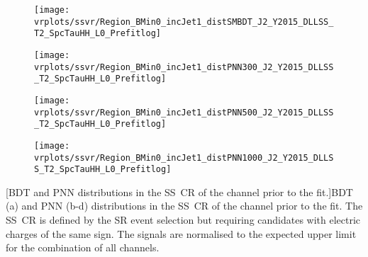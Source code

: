 {
  \centering

  \null\vfill

  \vspace*{1em}


  \begin{subfigure}{0.495\textwidth}
    \centering

    \texttt{[image: vrplots/ssvr/Region\_BMin0\_incJet1\_distSMBDT\_J2\_Y2015\_DLLSS\_T2\_SpcTauHH\_L0\_Prefitlog]}
    \subcaption{}
  \end{subfigure}\hfill%
  \begin{subfigure}{0.495\textwidth}
    \centering

    \texttt{[image: vrplots/ssvr/Region\_BMin0\_incJet1\_distPNN300\_J2\_Y2015\_DLLSS\_T2\_SpcTauHH\_L0\_Prefitlog]}
    \subcaption{}
  \end{subfigure}

  \begin{subfigure}{0.495\textwidth}
    \centering

    \texttt{[image: vrplots/ssvr/Region\_BMin0\_incJet1\_distPNN500\_J2\_Y2015\_DLLSS\_T2\_SpcTauHH\_L0\_Prefitlog]}
    \subcaption{}
  \end{subfigure}\hfill%
  \begin{subfigure}{0.495\textwidth}
    \centering

    \texttt{[image: vrplots/ssvr/Region\_BMin0\_incJet1\_distPNN1000\_J2\_Y2015\_DLLSS\_T2\_SpcTauHH\_L0\_Prefitlog]}
    \subcaption{}
  \end{subfigure}

  [BDT and PNN distributions in the SS~CR of the \hadhad
  channel prior to the fit.]{BDT (a) and PNN (b-d) distributions in the SS~CR of
    the \hadhad channel prior to the fit. The SS~CR is defined by the SR event
    selection but requiring \tauhadvis candidates with electric charges of the
    same sign. The signals are normalised to the expected upper limit for the
    combination of all channels.}

  \null\vfill
}


